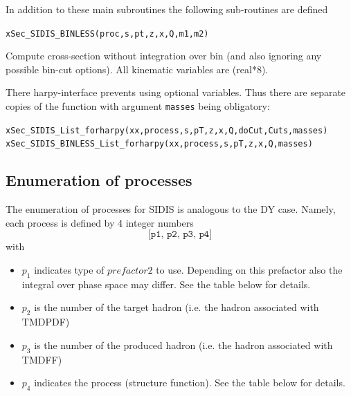 \documentclass[prd,nofootinbib,eqsecnum,final]{revtex4}
\renewcommand{\(}{\left(}
\renewcommand{\)}{\right)}
\renewcommand{\[}{\left[}
\renewcommand{\]}{\right]}
\begin{document}
In addition to these main subroutines the following sub-routines are defined
\begin{center}
\texttt{xSec\_SIDIS\_BINLESS(proc,s,pt,z,x,Q,m1,m2)}
\end{center}
Compute cross-section without integration over bin (and also ignoring any possible bin-cut options). All kinematic variables are (real*8).

There harpy-interface prevents using optional variables. Thus there are separate copies of the function with argument \texttt{masses} being obligatory:
\begin{center}
\texttt{xSec\_SIDIS\_List\_forharpy(xx,process,s,pT,z,x,Q,doCut,Cuts,masses)}
\\
\texttt{xSec\_SIDIS\_BINLESS\_List\_forharpy(xx,process,s,pT,z,x,Q,masses)}
\end{center}

\subsection{Enumeration of processes}

The enumeration of processes for SIDIS is analogous to the DY case. Namely, each process is defined by 4 integer numbers
$$\texttt{[p1, p2, p3, p4]}$$
with
\begin{itemize}
\item $p_1$ indicates type of $prefactor2$ to use. Depending on this prefactor also the integral over phase space may differ. See the table below for details.
\item $p_2$ is the number of the target hadron (i.e. the hadron associated with TMDPDF)
\item $p_3$ is the number of the produced hadron (i.e. the hadron associated with TMDFF)
\item $p_4$ indicates the process (structure function). See the table below for details.
\end{itemize}
\end{document}
